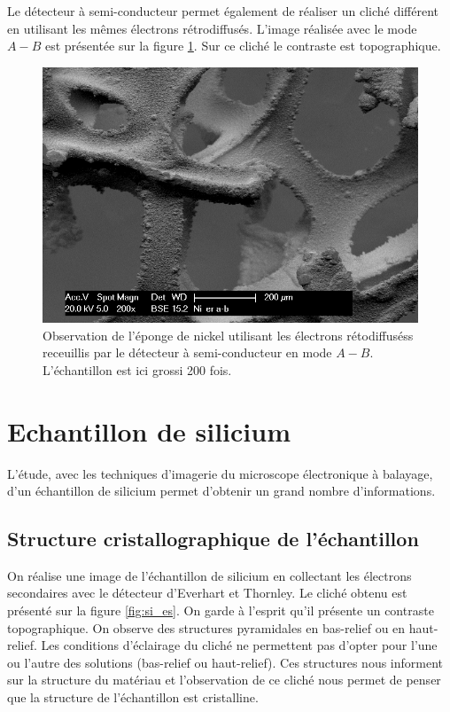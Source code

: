 \documentclass[a4paper,12pt]{article}
\newcommand\ett{Everhart et Thornley\xspace}
\begin{document}
Le détecteur à semi-conducteur permet également de réaliser un cliché différent en utilisant les mêmes électrons
rétrodiffusés. L'image réalisée avec le mode $A-B$ est présentée sur la figure \ref{fig:ni_er_amb}. Sur ce cliché
le contraste est topographique.

\begin{figure}
\centering
\includegraphics[width = 0.7 \textwidth]{images/ni_er_amb.png}
\caption{Observation de l'éponge de nickel utilisant les électrons rétodiffuséss receuillis par le détecteur à semi-conducteur en mode $A-B$. L'échantillon est ici grossi 200 fois.}
\label{fig:ni_er_amb}
\end{figure}
 

\section{Echantillon de silicium}

L'étude, avec les techniques d'imagerie du microscope électronique à balayage, d'un échantillon de silicium permet d'obtenir un grand nombre d'informations.

\subsection{Structure cristallographique de l'échantillon}

On réalise une image de l'échantillon de silicium en collectant les électrons secondaires avec le détecteur d'\ett.
Le cliché obtenu est présenté sur la figure \ref{fig:si_es}. On garde à l'esprit qu'il présente un contraste topographique.
On observe des structures pyramidales en bas-relief ou en haut-relief. Les conditions d'éclairage du cliché ne permettent
pas d'opter pour l'une ou l'autre des solutions (bas-relief ou haut-relief). Ces structures nous informent sur la structure
du matériau et l'observation de ce cliché nous permet de penser que la structure de l'échantillon est cristalline.
\end{document}
